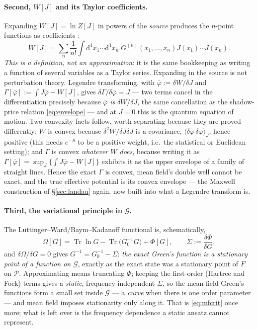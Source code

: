 \documentclass[10pt,a4paper]{article}
\newcommand{\dd}{\mathrm{d}}
\theoremstyle{plain}
\theoremstyle{definition}
\numberwithin{equation}{section}
\begin{document}
\paragraph{Second, $W[J]$ and its Taylor coefficients.} Expanding $W[J]=\ln Z[J]$ in powers of
the \emph{source} produces the $n$-point functions as coefficients \cite{Greiner}:
\begin{equation}
W[J]=\sum_n\frac1{n!}\int\!\dd^4x_1\cdots\dd^4x_n\;G^{(n)}(x_1,\dots,x_n)J(x_1)\cdots J(x_n).
\label{eq:volterra}
\end{equation}
\emph{This is a definition, not an approximation}: it is the same bookkeeping as writing a
function of several variables as a Taylor series. Expanding in the source is not perturbation
theory. Legendre transforming, with $\bar\varphi:=\delta W/\delta J$ and
$\Gamma[\bar\varphi]:=\int J\bar\varphi-W[J]$, gives $\delta\Gamma/\delta\bar\varphi=J$ --- two
terms cancel in the differentiation precisely because $\bar\varphi$ \emph{is} $\delta W/\delta
J$, the same cancellation as the shadow-price relation \eqref{eq:envelope} --- and at $J=0$ this
is the quantum equation of motion. Two convexity facts follow, worth separating because they are
proved differently: $W$ is convex because $\delta^2W/\delta J\delta J$ is a covariance,
$\langle\delta\varphi\,\delta\varphi\rangle_J$, hence positive (this needs $e^{-S}$ to be a
positive weight, i.e.\ the statistical or Euclidean setting); and $\Gamma$ is convex
\emph{whatever $W$ does}, because writing it as
$\Gamma[\bar\varphi]=\sup_J\{\int J\bar\varphi-W[J]\}$ exhibits it as the upper envelope of a
family of straight lines. Hence the exact $\Gamma$ is convex, mean field's double well cannot be
exact, and the true effective potential is its convex envelope --- the Maxwell construction of
\S\ref{sec:landau} again, now built into what a Legendre transform is.

\paragraph{Third, the variational principle in $\mathcal G$.} The
Luttinger--Ward/Baym--Kadanoff functional is, schematically,
\begin{equation}
\Omega[G]=\operatorname{Tr}\ln G-\operatorname{Tr}\big(G_0^{-1}G\big)+\Phi[G],
\qquad \Sigma:=\frac{\delta\Phi}{\delta G},
\label{eq:luttingerward}
\end{equation}
and $\delta\Omega/\delta G=0$ gives $G^{-1}=G_0^{-1}-\Sigma$: \emph{the exact Green's function
is a stationary point of a function on $\mathcal G$}, exactly as the exact state was a
stationary point of $F$ on $\mathcal P$. Approximating means truncating $\Phi$; keeping the
first-order (Hartree and Fock) terms gives a \emph{static}, frequency-independent $\Sigma$, so
the mean-field Green's functions form a small set inside $\mathcal G$ --- a \emph{curve} when
there is one order parameter --- and mean field imposes stationarity only along it. That is
\eqref{eq:mfcrit} once more; what is left over is the frequency dependence a static ansatz
cannot represent.
\end{document}
